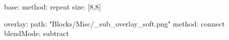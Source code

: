 base:
  method: repeat
  size: [8,8]

overlay:
  path: "Blocks/Misc/_sub_overlay_soft.png"
  method: connect
blendMode: subtract